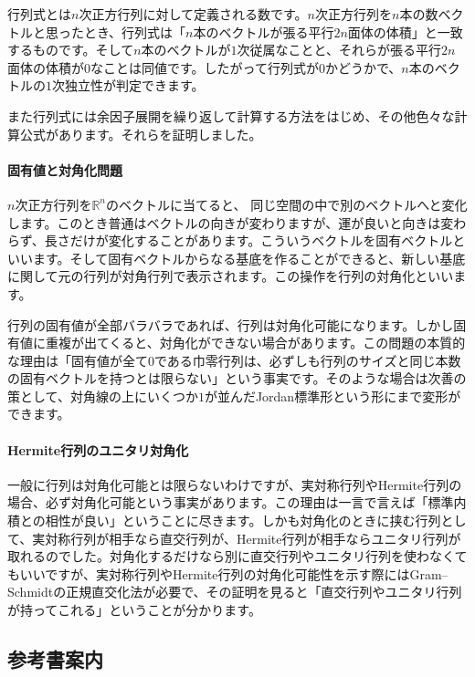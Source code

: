 行列式とは$n$次正方行列に対して定義される数です。$n$次正方行列を$n$本の数ベクトルと思ったとき、行列式は「$n$本のベクトルが張る平行$2n$面体の体積」と一致するものです。そして$n$本のベクトルが$1$次従属なことと、それらが張る平行$2n$面体の体積が$0$なことは同値です。したがって行列式が$0$かどうかで、$n$本のベクトルの$1$次独立性が判定できます。

また行列式には余因子展開を繰り返して計算する方法をはじめ、その他色々な計算公式があります。それらを証明しました。

\paragraph{固有値と対角化問題}

$n$次正方行列を$\mathbb{R}^n$のベクトルに当てると、	同じ空間の中で別のベクトルへと変化します。このとき普通はベクトルの向きが変わりますが、運が良いと向きは変わらず、長さだけが変化することがあります。こういうベクトルを固有ベクトルといいます。そして固有ベクトルからなる基底を作ることができると、新しい基底に関して元の行列が対角行列で表示されます。この操作を行列の対角化といいます。

行列の固有値が全部バラバラであれば、行列は対角化可能になります。しかし固有値に重複が出てくると、対角化ができない場合があります。この問題の本質的な理由は「固有値が全て$0$である巾零行列は、必ずしも行列のサイズと同じ本数の固有ベクトルを持つとは限らない」という事実です。そのような場合は次善の策として、対角線の上にいくつか$1$が並んだJordan標準形という形にまで変形ができます。

\paragraph{Hermite行列のユニタリ対角化}

一般に行列は対角化可能とは限らないわけですが、実対称行列やHermite行列の場合、必ず対角化可能という事実があります。この理由は一言で言えば「標準内積との相性が良い」ということに尽きます。しかも対角化のときに挟む行列として、実対称行列が相手なら直交行列が、Hermite行列が相手ならユニタリ行列が取れるのでした。対角化するだけなら別に直交行列やユニタリ行列を使わなくてもいいですが、実対称行列やHermite行列の対角化可能性を示す際にはGram--Schmidtの正規直交化法が必要で、その証明を見ると「直交行列やユニタリ行列が持ってこれる」ということが分かります。

\subsection{参考書案内}

